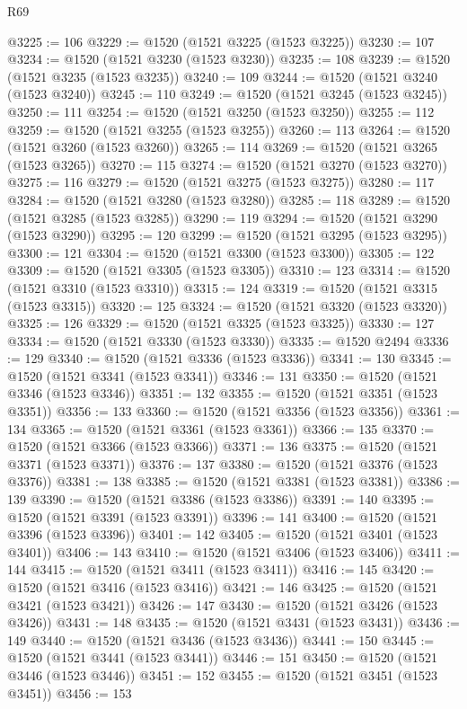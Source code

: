 \begin{lexlean}{R69}
\begin{coremodule}
{@3225 := 106
@3229 := @1520 (@1521 @3225 (@1523 @3225))
@3230 := 107
@3234 := @1520 (@1521 @3230 (@1523 @3230))
@3235 := 108
@3239 := @1520 (@1521 @3235 (@1523 @3235))
@3240 := 109
@3244 := @1520 (@1521 @3240 (@1523 @3240))
@3245 := 110
@3249 := @1520 (@1521 @3245 (@1523 @3245))
@3250 := 111
@3254 := @1520 (@1521 @3250 (@1523 @3250))
@3255 := 112
@3259 := @1520 (@1521 @3255 (@1523 @3255))
@3260 := 113
@3264 := @1520 (@1521 @3260 (@1523 @3260))
@3265 := 114
@3269 := @1520 (@1521 @3265 (@1523 @3265))
@3270 := 115
@3274 := @1520 (@1521 @3270 (@1523 @3270))
@3275 := 116
@3279 := @1520 (@1521 @3275 (@1523 @3275))
@3280 := 117
@3284 := @1520 (@1521 @3280 (@1523 @3280))
@3285 := 118
@3289 := @1520 (@1521 @3285 (@1523 @3285))
@3290 := 119
@3294 := @1520 (@1521 @3290 (@1523 @3290))
@3295 := 120
@3299 := @1520 (@1521 @3295 (@1523 @3295))
@3300 := 121
@3304 := @1520 (@1521 @3300 (@1523 @3300))
@3305 := 122
@3309 := @1520 (@1521 @3305 (@1523 @3305))
@3310 := 123
@3314 := @1520 (@1521 @3310 (@1523 @3310))
@3315 := 124
@3319 := @1520 (@1521 @3315 (@1523 @3315))
@3320 := 125
@3324 := @1520 (@1521 @3320 (@1523 @3320))
@3325 := 126
@3329 := @1520 (@1521 @3325 (@1523 @3325))
@3330 := 127
@3334 := @1520 (@1521 @3330 (@1523 @3330))
@3335 := @1520 @2494
@3336 := 129
@3340 := @1520 (@1521 @3336 (@1523 @3336))
@3341 := 130
@3345 := @1520 (@1521 @3341 (@1523 @3341))
@3346 := 131
@3350 := @1520 (@1521 @3346 (@1523 @3346))
@3351 := 132
@3355 := @1520 (@1521 @3351 (@1523 @3351))
@3356 := 133
@3360 := @1520 (@1521 @3356 (@1523 @3356))
@3361 := 134
@3365 := @1520 (@1521 @3361 (@1523 @3361))
@3366 := 135
@3370 := @1520 (@1521 @3366 (@1523 @3366))
@3371 := 136
@3375 := @1520 (@1521 @3371 (@1523 @3371))
@3376 := 137
@3380 := @1520 (@1521 @3376 (@1523 @3376))
@3381 := 138
@3385 := @1520 (@1521 @3381 (@1523 @3381))
@3386 := 139
@3390 := @1520 (@1521 @3386 (@1523 @3386))
@3391 := 140
@3395 := @1520 (@1521 @3391 (@1523 @3391))
@3396 := 141
@3400 := @1520 (@1521 @3396 (@1523 @3396))
@3401 := 142
@3405 := @1520 (@1521 @3401 (@1523 @3401))
@3406 := 143
@3410 := @1520 (@1521 @3406 (@1523 @3406))
@3411 := 144
@3415 := @1520 (@1521 @3411 (@1523 @3411))
@3416 := 145
@3420 := @1520 (@1521 @3416 (@1523 @3416))
@3421 := 146
@3425 := @1520 (@1521 @3421 (@1523 @3421))
@3426 := 147
@3430 := @1520 (@1521 @3426 (@1523 @3426))
@3431 := 148
@3435 := @1520 (@1521 @3431 (@1523 @3431))
@3436 := 149
@3440 := @1520 (@1521 @3436 (@1523 @3436))
@3441 := 150
@3445 := @1520 (@1521 @3441 (@1523 @3441))
@3446 := 151
@3450 := @1520 (@1521 @3446 (@1523 @3446))
@3451 := 152
@3455 := @1520 (@1521 @3451 (@1523 @3451))
@3456 := 153
}
\end{coremodule}
\end{lexlean}
